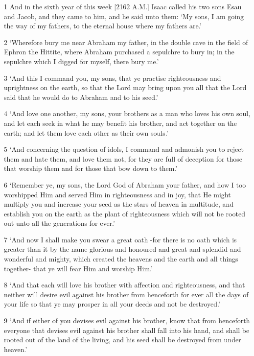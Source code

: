 \par 1 And in the sixth year of this week [2162 A.M.] Isaac called his two sons Esau and Jacob, and they came to him, and he said unto them: ‘My sons, I am going the way of my fathers, to the eternal house where my fathers are.’
\par 2 ‘Wherefore bury me near Abraham my father, in the double cave in the field of Ephron the Hittite, where Abraham purchased a sepulchre to bury in; in the sepulchre which I digged for myself, there bury me.’
\par 3 ‘And this I command you, my sons, that ye practise righteousness and uprightness on the earth, so that the Lord may bring upon you all that the Lord said that he would do to Abraham and to his seed.’
\par 4 ‘And love one another, my sons, your brothers as a man who loves his own soul, and let each seek in what he may benefit his brother, and act together on the earth; and let them love each other as their own souls.’
\par 5 ‘And concerning the question of idols, I command and admonish you to reject them and hate them, and love them not, for they are full of deception for those that worship them and for those that bow down to them.’
\par 6 ‘Remember ye, my sons, the Lord God of Abraham your father, and how I too worshipped Him and served Him in righteousness and in joy, that He might multiply you and increase your seed as the stars of heaven in multitude, and establish you on the earth as the plant of righteousness which will not be rooted out unto all the generations for ever.’
\par 7 ‘And now I shall make you swear a great oath -for there is no oath which is greater than it by the name glorious and honoured and great and splendid and wonderful and mighty, which created the heavens and the earth and all things together- that ye will fear Him and worship Him.’
\par 8 ‘And that each will love his brother with affection and righteousness, and that neither will desire evil against his brother from henceforth for ever all the days of your life so that ye may prosper in all your deeds and not be destroyed.’
\par 9 ‘And if either of you devises evil against his brother, know that from henceforth everyone that devises evil against his brother shall fall into his hand, and shall be rooted out of the land of the living, and his seed shall be destroyed from under heaven.’
